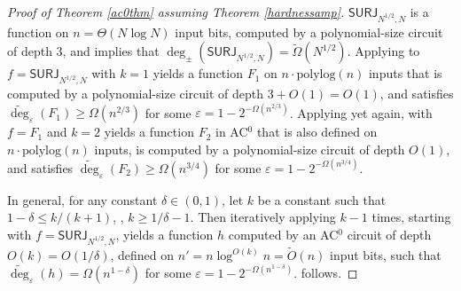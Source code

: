 \documentclass{toc}
\newcommand{\polylog}{\mathrm{polylog}}
\newcommand{\SURJ}{\mathsf{ SURJ}}
\newcommand{\eps}{\varepsilon}
\newcommand{\adeg}{\widetilde{\operatorname{deg}}}
\begin{document}
\begin{proof}[Proof of Theorem \ref{ac0thm} assuming Theorem \ref{hardnessamp}]
$\SURJ_{N^{1/2}, N}$ is a function on $n=\Theta(N \log N)$ input bits,
%
computed by a polynomial-size %
circuit of depth 3, and 
	 implies that $\deg_{\pm}(\SURJ_{N^{1/2}, N}) = \tilde{\Omega}(N^{1/2})$.
	Applying  to $f=\SURJ_{N^{1/2}, N}$ with $k=1$ yields a function $F_1$ 
	on $n \cdot \polylog(n)$ inputs that is computed by a 
polynomial-size %
circuit of depth $3+O(1)=O(1)$, and satisfies $\adeg_{\eps}(F_1) \geq \Omega(n^{2/3})$
	for some $\eps=1-2^{-\Omega(n^{2/3})}$.
	Applying  yet again, with $f=F_1$ and $k=2$
	yields a function $F_2$ in AC$^0$ that is also defined on $n \cdot \polylog(n)$ inputs, is computed
by a polynomial-size %
circuit of depth $O(1)$, and satisfies 
	$\adeg_{\eps}(F_2) \geq \Omega(n^{3/4})$
	for some $\eps=1-2^{-\Omega(n^{3/4})}$. %
	
	In general, for any constant $\delta \in (0, 1)$, let $k$ be a constant such that $1-\delta \le k/(k+1)$,
	\ie, $k \ge 1/\delta-1$. 
	Then iteratively applying  $k-1$ times, starting with $f=\SURJ_{N^{1/2}, N}$,
	yields a function $h$ computed by an AC$^0$ circuit of depth $O(k)=O(1/\delta)$, defined on $n' = n \log^{O(k)} n = \tilde{O}(n)$ input bits,
	such that $\adeg_{\eps}(h) = \Omega(n^{1-\delta})$
	for some $\eps=1-2^{-\Omega(n^{1-\delta})}$.  follows.
\end{proof}
\end{document}
